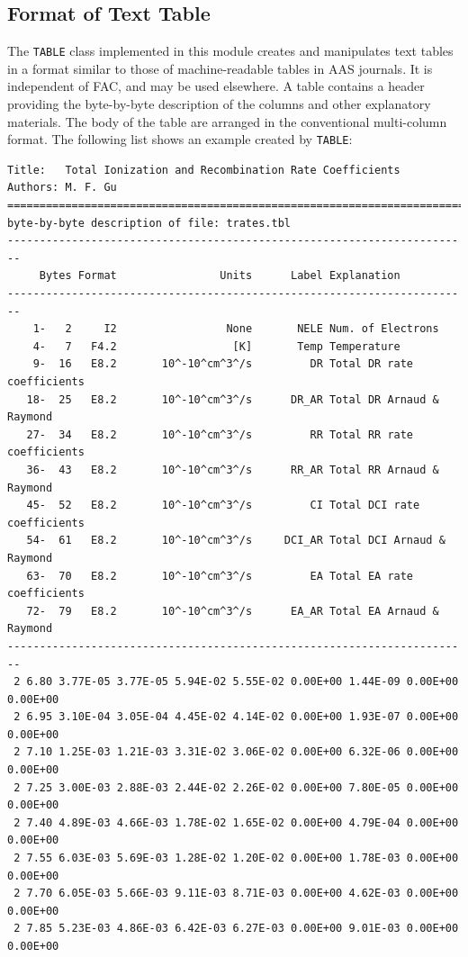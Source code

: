 \documentclass[twoside,letterpaper]{refrep}
\newcommand{\key}[1]{\texttt{#1}}
\begin{document}
\subsection{Format of Text Table}
\label{subsec:format}
The \key{TABLE} class implemented in this module creates and manipulates
text tables in a format similar to those of machine-readable tables in AAS
journals. It is independent of FAC, and may be used elsewhere. A table
contains a header providing the byte-by-byte description of the columns and
other explanatory materials. The body of the table are arranged in the
conventional multi-column format. The following list shows an example created
by \key{TABLE}:
\begin{verbatim}
Title:   Total Ionization and Recombination Rate Coefficients
Authors: M. F. Gu
========================================================================
byte-by-byte description of file: trates.tbl
------------------------------------------------------------------------
     Bytes Format                Units      Label Explanation
------------------------------------------------------------------------
    1-   2     I2                 None       NELE Num. of Electrons
    4-   7   F4.2                  [K]       Temp Temperature
    9-  16   E8.2       10^-10^cm^3^/s         DR Total DR rate coefficients
   18-  25   E8.2       10^-10^cm^3^/s      DR_AR Total DR Arnaud & Raymond
   27-  34   E8.2       10^-10^cm^3^/s         RR Total RR rate coefficients
   36-  43   E8.2       10^-10^cm^3^/s      RR_AR Total RR Arnaud & Raymond
   45-  52   E8.2       10^-10^cm^3^/s         CI Total DCI rate coefficients
   54-  61   E8.2       10^-10^cm^3^/s     DCI_AR Total DCI Arnaud & Raymond
   63-  70   E8.2       10^-10^cm^3^/s         EA Total EA rate coefficients
   72-  79   E8.2       10^-10^cm^3^/s      EA_AR Total EA Arnaud & Raymond
------------------------------------------------------------------------
 2 6.80 3.77E-05 3.77E-05 5.94E-02 5.55E-02 0.00E+00 1.44E-09 0.00E+00 0.00E+00 
 2 6.95 3.10E-04 3.05E-04 4.45E-02 4.14E-02 0.00E+00 1.93E-07 0.00E+00 0.00E+00 
 2 7.10 1.25E-03 1.21E-03 3.31E-02 3.06E-02 0.00E+00 6.32E-06 0.00E+00 0.00E+00 
 2 7.25 3.00E-03 2.88E-03 2.44E-02 2.26E-02 0.00E+00 7.80E-05 0.00E+00 0.00E+00 
 2 7.40 4.89E-03 4.66E-03 1.78E-02 1.65E-02 0.00E+00 4.79E-04 0.00E+00 0.00E+00 
 2 7.55 6.03E-03 5.69E-03 1.28E-02 1.20E-02 0.00E+00 1.78E-03 0.00E+00 0.00E+00 
 2 7.70 6.05E-03 5.66E-03 9.11E-03 8.71E-03 0.00E+00 4.62E-03 0.00E+00 0.00E+00 
 2 7.85 5.23E-03 4.86E-03 6.42E-03 6.27E-03 0.00E+00 9.01E-03 0.00E+00 0.00E+00 

\end{verbatim}
\end{document}
